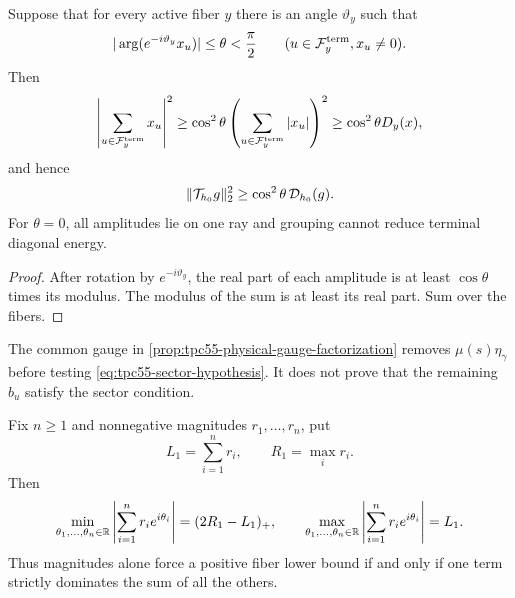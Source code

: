 \begin{theorem}
\label{thm:tpc55-sector-criterion}
Suppose that for every active fiber \(y\) there is an angle \(\vartheta_y\)
such that
\begin{equation}
 |\arg(e^{-i\vartheta_y}x_u)|\le\theta<\frac\pi2
 \qquad(u\in\mathcal F_y^{\rm term}, x_u\ne0).
 \label{eq:tpc55-sector-hypothesis}
\end{equation}
Then
\begin{equation}
 \left|\sum_{u\in\mathcal F_y^{\rm term}}x_u\right|^2
 \ge\cos^2\theta
 \left(\sum_{u\in\mathcal F_y^{\rm term}}|x_u|\right)^2
 \ge\cos^2\theta D_y(x),
 \label{eq:tpc55-sector-lower-bound}
\end{equation}
and hence
\begin{equation}
 \|\mathcal T_{h_0}g\|_2^2
 \ge\cos^2\theta\,\mathcal D_{h_0}(g).
 \label{eq:tpc55-global-sector-bound}
\end{equation}
For \(\theta=0\), all amplitudes lie on one ray and grouping cannot reduce
terminal diagonal energy.
\end{theorem}

\begin{proof}
After rotation by \(e^{-i\vartheta_y}\), the real part of each amplitude
is at least \(\cos\theta\) times its modulus.  The modulus of the sum is at
least its real part.  Sum over the fibers.
\end{proof}

The common gauge in \cref{prop:tpc55-physical-gauge-factorization}
removes \(\mu(s)\eta_\gamma\) before testing
\eqref{eq:tpc55-sector-hypothesis}.  It does not prove that the remaining
\(b_u\) satisfy the sector condition.

\begin{theorem}
\label{thm:tpc55-polygon-envelope}
Fix \(n\ge1\) and nonnegative magnitudes \(r_1,\ldots,r_n\), put
\begin{equation}
 L_1=\sum_{i=1}^nr_i,
 \qquad R_1=\max_i r_i.
 \label{eq:tpc55-polygon-data}
\end{equation}
Then
\begin{equation}
 \min_{\theta_1,\ldots,\theta_n\in\mathbb R}
 \left|\sum_{i=1}^nr_i e^{i\theta_i}\right|
 =(2R_1-L_1)_+,
 \qquad
 \max_{\theta_1,\ldots,\theta_n\in\mathbb R}
 \left|\sum_{i=1}^nr_i e^{i\theta_i}\right|=L_1.
 \label{eq:tpc55-polygon-envelope}
\end{equation}
Thus magnitudes alone force a positive fiber lower bound if and only if one
term strictly dominates the sum of all the others.
\end{theorem}

